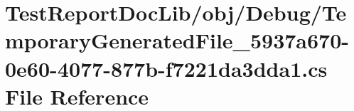 \hypertarget{_test_report_doc_lib_2obj_2_debug_2_temporary_generated_file__5937a670-0e60-4077-877b-f7221da3dda1_8cs}{\section{Test\+Report\+Doc\+Lib/obj/\+Debug/\+Temporary\+Generated\+File\+\_\+5937a670-\/0e60-\/4077-\/877b-\/f7221da3dda1.cs File Reference}
\label{_test_report_doc_lib_2obj_2_debug_2_temporary_generated_file__5937a670-0e60-4077-877b-f7221da3dda1_8cs}
}
